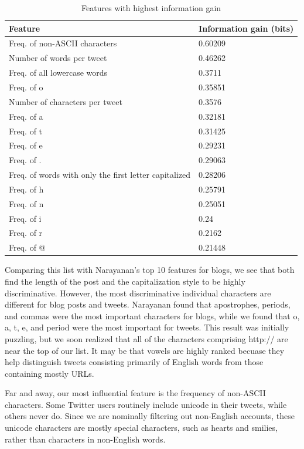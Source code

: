 \documentclass[10pt, conference, compsocconf]{IEEEtran}
\begin{document}
\begin{table}[h]
  \centering
  \begin{tabular}{ll}
    \toprule
    \bf{Feature} & \bf{Information gain (bits)} \\ \midrule
    Freq. of non-ASCII characters & 0.60209 \\ \midrule
    Number of words per tweet & 0.46262 \\ \midrule
    Freq. of all lowercase words & 0.3711 \\ \midrule
    Freq. of o & 0.35851 \\ \midrule
    Number of characters per tweet & 0.3576 \\ \midrule
    Freq. of a & 0.32181 \\ \midrule
    Freq. of t & 0.31425 \\ \midrule
    Freq. of e & 0.29231 \\ \midrule
    Freq. of . & 0.29063 \\ \midrule
    Freq. of words with only the first letter capitalized & 0.28206 \\ \midrule
    Freq. of h & 0.25791 \\ \midrule
    Freq. of n & 0.25051 \\ \midrule
    Freq. of i & 0.24 \\ \midrule
    Freq. of r & 0.2162 \\ \midrule
    Freq. of @ & 0.21448 \\
    \bottomrule
  \end{tabular}
  \caption{Features with highest information gain}
\end{table}

Comparing this list with Narayanan's top 10 features for blogs, we see
that both find the length of the post and the capitalization style to
be highly discriminative. However, the most discriminative individual
characters are different for blog posts and tweets. Narayanan found
that apostrophes, periods, and commas were the most important
characters for blogs, while we found that o, a, t, e, and period were
the most important for tweets. This result was initially puzzling, but
we soon realized that all of the characters comprising http:// are
near the top of our list. It may be that vowels are highly ranked
becuase they help distinguish tweets consisting primarily of English
words from those containing mostly URLs.

Far and away, our most influential feature is the frequency of
non-ASCII characters. Some Twitter users routinely include unicode in
their tweets, while others never do. Since we are nominally filtering
out non-English accounts, these unicode characters are mostly special
characters, such as hearts and smilies, rather than characters in
non-English words.
\end{document}
